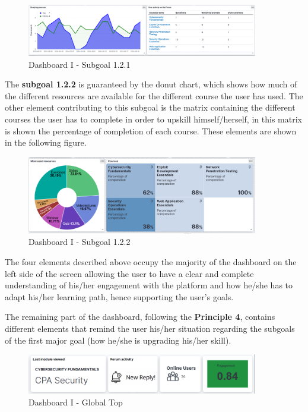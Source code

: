 \begin{figure}[H]
    \centering
    \includegraphics[width=0.9\textwidth]{assets/dashboard_1_121.png}
    \caption{Dashboard I - Subgoal 1.2.1}
    \label{fig:dashboard_1_subgoal_121}
\end{figure}


The \textbf{subgoal 1.2.2} is guaranteed by the donut chart, which shows how much
of the different resources are available for the different course the user has
used. The other element contributing to this subgoal is the matrix containing
the different courses the user has to complete in order to upskill himself/herself,
in this matrix is shown the percentage of completion of each course. These elements
are shown in the following figure.

\begin{figure}[H]
    \centering
    \includegraphics[width=0.9\textwidth]{assets/dashboard_1_122.png}
    \caption{Dashboard I - Subgoal 1.2.2}
    \label{fig:dashboard_1_subgoal_122}
\end{figure}

The four elements described above occupy the majority of the dashboard on 
the left side of the screen allowing the user to have a clear and complete
understanding of his/her engagement with the platform and how he/she has to
adapt his/her learning path, hence supporting the user's goals. 

The remaining part of the dashboard, following the
\textbf{Principle 4}, contains different elements that remind the user his/her
situation regarding the subgoals of the first major goal (how he/she is upgrading 
his/her skill). 

\begin{figure}[H]
    \centering
    \includegraphics[width=0.9\textwidth]{assets/dashboard_1_globaltop.png}
    \caption{Dashboard I - Global Top}
    \label{fig:dashboard_1_global_top}
\end{figure}

